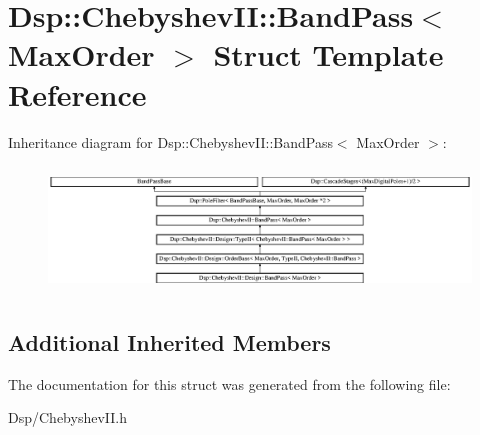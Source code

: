 \hypertarget{structDsp_1_1ChebyshevII_1_1BandPass}{\section{Dsp\-:\-:Chebyshev\-I\-I\-:\-:Band\-Pass$<$ Max\-Order $>$ Struct Template Reference}
\label{structDsp_1_1ChebyshevII_1_1BandPass}
}
Inheritance diagram for Dsp\-:\-:Chebyshev\-I\-I\-:\-:Band\-Pass$<$ Max\-Order $>$\-:\begin{figure}[H]
\begin{center}
\leavevmode
\includegraphics[height=3.380282cm]{structDsp_1_1ChebyshevII_1_1BandPass}
\end{center}
\end{figure}
\subsection*{Additional Inherited Members}


The documentation for this struct was generated from the following file\-:\begin{DoxyCompactItemize}
\item 
Dsp/Chebyshev\-I\-I.\-h\end{DoxyCompactItemize}
